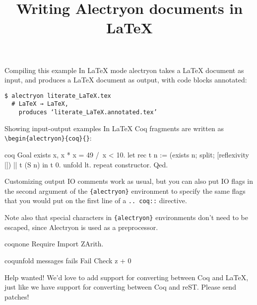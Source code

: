 \documentclass[10pt]{beamer}
\title{Writing Alectryon documents in LaTeX}
\begin{document}
\maketitle

\begin{frame}[fragile]{Compiling this example}
  In LaTeX mode alectryon takes a LaTeX document as input, and produces a LaTeX
  document as output, with code blocks annotated:

  \begin{verbatim}
$ alectryon literate_LaTeX.tex
  # LaTeX → LaTeX,
    produces ‘literate_LaTeX.annotated.tex’
  \end{verbatim}
\end{frame}

\begin{frame}[fragile]{Showing input-output examples}
  In LaTeX Coq fragments are written as \verb|\begin{alectryon}{coq}{}|:

  \begin{alectryon}{coq}{}
  Goal exists x, x * x = 49 /\ x < 10.
    let rec t n :=
      (exists n; split; [reflexivity |]) || t (S n) in
    t 0.
    unfold lt.
    repeat constructor.
  Qed.
  \end{alectryon}
\end{frame}

\begin{frame}[fragile]{Customizing output}
  IO comments work as usual, but you can also put IO flags in the second argument of the \verb|{alectryon}| environment to specify the same flags that you would put on the first line of a \verb|.. coq::| directive.

  Note also that special characters in \verb|{alectryon}| environments don't need to be escaped, since Alectryon is used as a preprocessor.

  \begin{alectryon}{coq}{none}
  Require Import ZArith.
  \end{alectryon}

  \begin{alectryon}{coq}{unfold messages fails}
  Fail Check z + 0%
  \end{alectryon}
\end{frame}

\begin{frame}{Help wanted!}
  We'd love to add support for converting between Coq and LaTeX, just like we have support for converting between Coq and reST.  Please send patches!
\end{frame}
\end{document}
